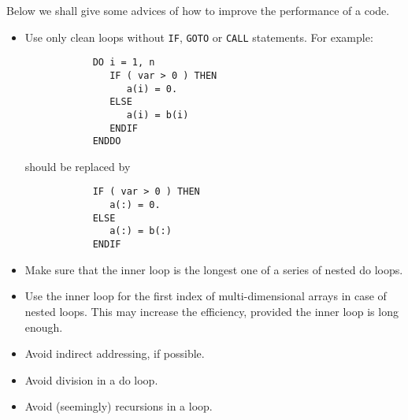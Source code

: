 \documentclass[12pt]{book}
\begin{document}
Below we shall give some advices of how to improve the performance of a code.
\begin{itemize}
   \item Use only clean loops without {\tt IF}, {\tt GOTO} or {\tt CALL} statements. For example:
         \begin{verbatim}
            DO i = 1, n
               IF ( var > 0 ) THEN
                  a(i) = 0.
               ELSE
                  a(i) = b(i)
               ENDIF
            ENDDO
         \end{verbatim}
         should be replaced by
         \begin{verbatim}
            IF ( var > 0 ) THEN
               a(:) = 0.
            ELSE
               a(:) = b(:)
            ENDIF
         \end{verbatim}
   \item Make sure that the inner loop is the longest one of a series of nested do loops.
   \item Use the inner loop for the first index of multi-dimensional arrays in case of nested
         loops. This may increase the efficiency, provided the inner loop is long enough.
   \item Avoid indirect addressing, if possible.
   \item Avoid division in a do loop.
   \item Avoid (seemingly) recursions in a loop.
\end{itemize}

 \label{ch:machdep}
\end{document}
